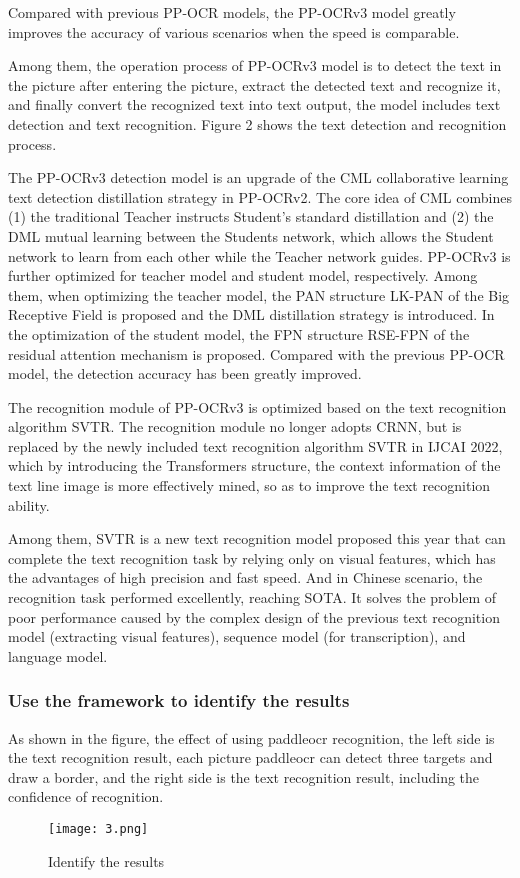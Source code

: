 \documentclass[12pt]{apmcmthesis}
\begin{document}
\setlength{\parindent}{2em}Compared with previous PP-OCR models, the PP-OCRv3 model greatly improves the accuracy of various scenarios when the speed is comparable.

\setlength{\parindent}{2em}Among them, the operation process of PP-OCRv3 model is to detect the text in the picture after entering the picture, extract the detected text and recognize it, and finally convert the recognized text into text output, the model includes text detection and text recognition. Figure 2 shows the text detection and recognition process.

\setlength{\parindent}{2em}The PP-OCRv3 detection model is an upgrade of the CML collaborative learning text detection distillation strategy in PP-OCRv2. The core idea of CML combines (1) the traditional Teacher instructs Student's standard distillation and (2) the DML mutual learning between the Students network, which allows the Student network to learn from each other while the Teacher network guides. PP-OCRv3 is further optimized for teacher model and student model, respectively. Among them, when optimizing the teacher model, the PAN\cite{5} structure LK-PAN of the Big Receptive Field is proposed and the DML distillation strategy is introduced. In the optimization of the student model, the FPN\cite{6} structure RSE-FPN of the residual attention mechanism is proposed. Compared with the previous PP-OCR model, the detection accuracy has been greatly improved.

\setlength{\parindent}{2em}The recognition module of PP-OCRv3 is optimized based on the text recognition algorithm SVTR. The recognition module no longer adopts CRNN, but is replaced by the newly included text recognition algorithm SVTR \cite{7} in IJCAI 2022, which by introducing the Transformers structure, the context information of the text line image is more effectively mined, so as to improve the text recognition ability.

\setlength{\parindent}{2em}Among them, SVTR is a new text recognition model proposed this year that can complete the text recognition task by relying only on visual features, which has the advantages of high precision and fast speed. And in Chinese scenario, the recognition task performed excellently, reaching SOTA. It solves the problem of poor performance caused by the complex design of the previous text recognition model (extracting visual features), sequence model (for transcription), and language model.


\subsubsection{Use the framework to identify the results}
\setlength{\parindent}{2em}As shown in the figure, the effect of using paddleocr recognition, the left side is the text recognition result, each picture paddleocr can detect three targets and draw a border, and the right side is the text recognition result, including the confidence of recognition.
\begin{figure}[htbp]
	\centering
	\texttt{[image: 3.png]}
	\caption{Identify the results}
	\label{a}
\end{figure}
\end{document}
